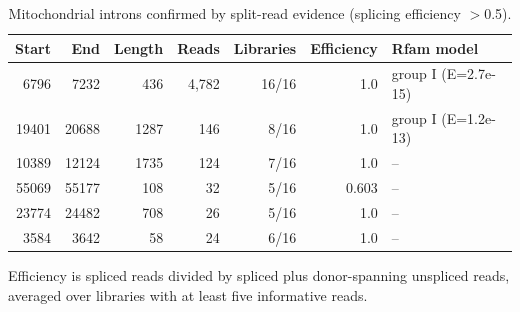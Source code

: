 \begin{table}[htbp]
\caption{Mitochondrial introns confirmed by split-read evidence (splicing efficiency $>$0.5).}\label{tab:introns}
\footnotesize
\begin{tabular}{@{}rrrrrrl@{}}
\toprule
Start & End & Length & Reads & Libraries & Efficiency & Rfam model \\
\midrule
6796 & 7232 & 436 & 4,782 & 16/16 & 1.0 & group I (E=2.7e-15) \\
19401 & 20688 & 1287 & 146 & 8/16 & 1.0 & group I (E=1.2e-13) \\
10389 & 12124 & 1735 & 124 & 7/16 & 1.0 & -- \\
55069 & 55177 & 108 & 32 & 5/16 & 0.603 & -- \\
23774 & 24482 & 708 & 26 & 5/16 & 1.0 & -- \\
3584 & 3642 & 58 & 24 & 6/16 & 1.0 & -- \\
\bottomrule
\end{tabular}
\begin{tablenotes}[flushleft]\footnotesize\item Efficiency is spliced reads divided by spliced plus donor-spanning unspliced reads, averaged over libraries with at least five informative reads.\end{tablenotes}
\end{table}
